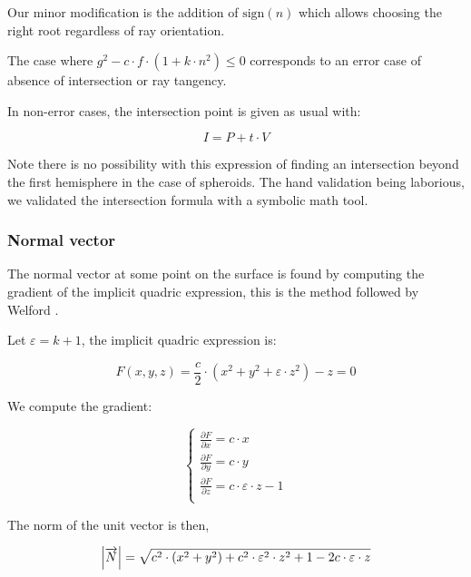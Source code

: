 Our minor modification is the addition of $\textrm{sign}(n)$ which allows
choosing the right root regardless of ray orientation.

The case where $g^2 - c \cdot f \cdot (1 + k \cdot n^2) \leq 0$ corresponds
to an error case of absence of intersection or ray tangency.

In non-error cases, the intersection point is given as usual with:

\begin{equation}
I = P + t \cdot V
\end{equation}

Note there is no possibility with this expression of finding an intersection
beyond the first hemisphere in the case of spheroids. The hand validation being
laborious, we validated the intersection formula with a symbolic math tool.

\subsubsection{Normal vector}
The normal vector at some point on the surface is found by computing the
gradient of the implicit quadric expression, this is the method followed by
Welford \cite{Welford:1986}.

Let $\varepsilon = k+1$, the implicit quadric expression is:

\begin{equation}
F(x,y,z) = \frac{c}{2} \cdot (x^2 + y^2 + \varepsilon \cdot z^2) - z = 0
\end{equation}

We compute the gradient:

\begin{equation} \begin{cases}
\frac{\partial F}{\partial x} = c \cdot x\\
\frac{\partial F}{\partial y} = c \cdot y\\
\frac{\partial F}{\partial z} = c \cdot \varepsilon \cdot z - 1\\
\end{cases} \end{equation}

The norm of the unit vector is then,

\begin{equation}
\abs{\overrightarrow{N}} =
\sqrt{c^2 \cdot (x^2 + y^2) + c^2 \cdot \varepsilon^2
  \cdot z^2 + 1 - 2 c \cdot \varepsilon \cdot z} \\
\end{equation}


